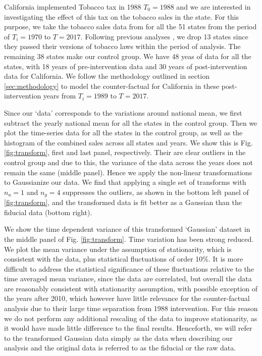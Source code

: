 \documentclass{article}
\begin{document}
California implemented Tobacco tax in 1988 $T_0 = 1988$ and we are interested in investigating the effect of this tax on the tobacco sales in the state. For this purpose, we take the tobacco sales data from \cite{sourcetobacco, Orzechowski12} for all the 51 states from the period of $T_i=1970$ to $T=2017$. Following previous analyses \cite{Abadie10, Ben-Michael18}, we drop 13 states since they passed their versions of tobacco laws within the period of analysis. The remaining 38 states make our control group. We have 48 yeas of data for all the states, with 18 years of pre-intervention data and 30 years of post-intervention data for California. We follow the methodology outlined in section \ref{sec:methodology} to model the counter-factual for California in these post-intervention years from $T_i=1989$ to $T=2017$.

Since our `data' corresponds to the variations around national mean, we first subtract the yearly national mean for all the states in the control group. Then we plot the time-series data for all the states in the control group, as well as the histogram of the combined sales across all states and years. We show this is Fig. \ref{fig:transform}, first and last panel, respectively. Their are clear outliers in the control group and due to this, the variance of the data across the years does not remain the same (middle panel). Hence we apply the non-linear transformations to Gaussianize our data. We find that applying a single set of transforms with $n_a=1$ and $n_y=4$ suppresses the outliers, as shown in the bottom left panel of \ref{fig:transform}, and the transformed data is fit better 
as a Gaussian than the fiducial data (bottom right). 

We show the time dependent variance of this transformed `Gaussian' dataset in the middle panel of Fig. \ref{fig:transform}. Time variation has been strong reduced. 
We plot the mean variance under the assumption of stationarity, 
which is consistent with the data, plus statistical 
fluctuations of order 10\%. It is more difficult to address the statistical 
significance of these fluctuations relative to the time 
averaged mean 
variance, since the data are correlated, but overall the 
data are reasonably consistent with stationarity assumption, 
with possible exception of the years after 2010, which however 
have little relevance for the counter-factual analysis due 
to their large time separation from 1988 intervention. For 
this reason we do not perform any additional rescaling of the 
data to improve stationarity, as it would have made 
little difference to the final results. 
Henceforth, we will refer to the transformed Gaussian data simply as the data when describing our analysis and the original data is referred to as the fiducial or the raw data. 
\end{document}
